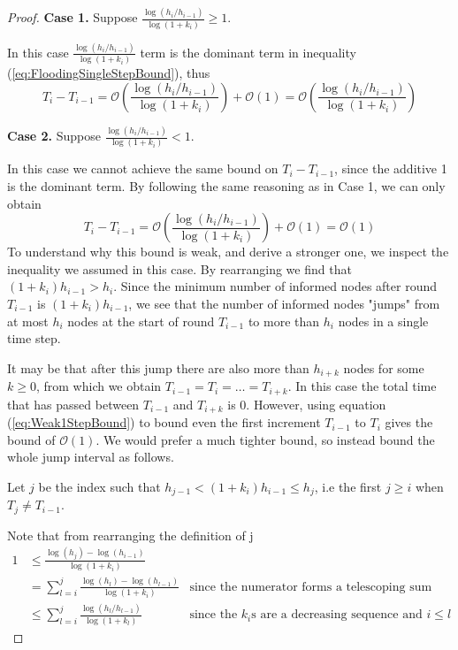 \documentclass[a4paper,11pt]{article}
\theoremstyle{definition}
\begin{document}
\begin{proof}
	\textbf{Case 1.} Suppose $\frac{\log (h_i/h_{i-1})}{\log(1+k_i)} \geq 1$.

	In this case $\frac{\log (h_i/h_{i-1})}{\log(1+k_i)}$ term is the dominant term in inequality (\ref{eq:FloodingSingleStepBound}), thus
	$$
		T_i - T_{i-1} = \mathcal{O}\left( \frac{\log (h_i/h_{i-1})}{\log(1+k_i) }\right) + \mathcal{O}(1) = \mathcal{O}\left( \frac{\log (h_i/h_{i-1})}{\log(1+k_i) }\right)
	$$

	\textbf{Case 2.} Suppose $\frac{\log (h_i/h_{i-1})}{\log(1+k_i)} < 1$.

	In this case we cannot achieve the same bound on $T_i - T_{i-1}$, since the additive 1 is the dominant term. By following the same reasoning as in Case 1, we can only obtain
	\begin{equation}\label{eq:Weak1StepBound}
		T_i - T_{i-1} = \mathcal{O}\left( \frac{\log (h_i/h_{i-1})}{\log(1+k_i) }\right) + \mathcal{O}(1) = \mathcal{O}(1)
	\end{equation}
	To understand why this bound is weak, and derive a stronger one, we inspect the inequality we assumed in this case. %
	By rearranging we find that $(1+k_i)h_{i-1} > h_i$. Since the minimum number of informed nodes after round $T_{i-1}$ is $(1+k_i)h_{i-1}$, we see that the number of informed nodes "jumps" from at most $h_i$ nodes at the start of round $T_{i-1}$ to more than $h_i$ nodes in a single time step.

	It may be that after this jump there are also more than $h_{i+k}$ nodes for some $k \geq 0$, from which we obtain $T_{i-1} = T_i = \dots = T_{i+k}$. In this case the total time that has passed between $T_{i-1}$ and $T_{i+k}$ is 0. However, using equation (\ref{eq:Weak1StepBound}) to bound even the first increment $T_{i-1}$ to $T_i$ gives the bound of $\mathcal{O}(1)$. We would prefer a much tighter bound, so instead bound the whole jump interval as follows. %
	
	Let $j$ be the index such that $h_{j-1} < (1+k_i)h_{i-1} \leq h_j$, i.e the first $j \geq i$ when $T_j \neq T_{i-1}$. %

	Note that from rearranging the definition of j
	\begin{align*}\label{eq:JumpBoundGeq1}
		1 &\leq \frac{\log (h_j) - \log(h_{i-1})}{\log(1+k_i) } \\
		& =\sum_{l=i}^j \frac{\log (h_{l}) - \log(h_{l-1})}{\log(1+k_i) } & \text{since the numerator forms a telescoping sum} \\
		& \leq \sum_{l=i}^j \frac{\log (h_{l}/h_{l-1})}{\log(1+k_l) } & \text{since the } k_i \text{s are a decreasing sequence and } i \leq l
	\end{align*}
	

\end{proof}
\end{document}

